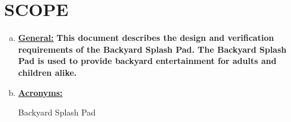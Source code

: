 \section{SCOPE}



\begin{enumerate}[(a)]
	\item \textbf{\underline{General:}} \textbf{This document describes the design and verification requirements of the Backyard Splash Pad. The Backyard Splash Pad is used to provide backyard entertainment for adults and children alike.}
\bigskip



	\item \textbf{\underline{Acronyms:}}
	
	 Backyard Splash Pad
	


\end{enumerate}

